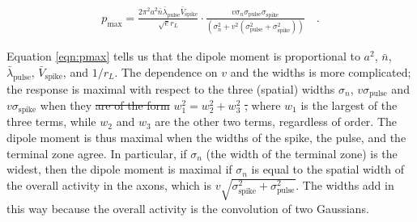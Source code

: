 \documentclass[]{article}
\providecommand{\DIFaddtex}[1]{{\protect\color{blue}\uwave{#1}}} %
\providecommand{\DIFdeltex}[1]{{\protect\color{red}\sout{#1}}}                      %
\providecommand{\DIFaddbegin}{} %
\providecommand{\DIFaddend}{} %
\providecommand{\DIFdelbegin}{} %
\providecommand{\DIFdelend}{} %
\providecommand{\DIFadd}[1]{\texorpdfstring{\DIFaddtex{#1}}{#1}} %
\providecommand{\DIFdel}[1]{\texorpdfstring{\DIFdeltex{#1}}{}} %
\begin{document}
\begin{align}
p_\text{max} = \frac{2  \pi^2  a^2 \bar{n} \bar{\lambda}_{\text{pulse}} \bar{V}_{\text{spike}}}{\sqrt{e} r_L } \cdot
\frac{v \sigma_n \sigma_{\text{pulse}} \sigma_{\text{spike}}}
{\left(\sigma_n^2+v^2 \left(\sigma_{\text{pulse}}^2+\sigma_{\text{spike}}^2\right)\right)} \label{eqn:pmax}
\quad .
\end{align}

Equation \ref{eqn:pmax} tells us that the dipole moment is proportional
to \(a^2\), \(\bar{n}\), \(\bar{\lambda}_{\text{pulse}}\),
\(\bar{V}_{\text{spike}}\), and \(1/r_L\). The dependence on \(v\) and
the widths is more complicated; the response is maximal with respect to
the three (spatial) widths \(\sigma_n\), \(v\sigma_{\text{pulse}}\) and
\(v\sigma_{\text{spike}}\) when they \DIFdelbegin \DIFdel{are of the form
}\DIFdelend \DIFaddbegin \DIFadd{satisfy the condition
}\DIFaddend \(w_1^2=w_2^2+w_3^2\) \DIFdelbegin \DIFdel{, }\DIFdelend where \(w_1\) is the largest of the three terms,
while \(w_2\) and \(w_3\) are the other two terms, regardless of order.
The dipole moment is thus maximal when the widths of the spike, the
pulse, and the terminal zone agree. In particular, if \(\sigma_n\) (the
width of the terminal zone) is the widest, then the dipole moment is
maximal if \(\sigma_n\) is equal to the spatial width of the overall
activity in the axons, which is
\(v\sqrt{\sigma_{\text{spike}}^2+\sigma_{\text{pulse}}^2}\). The widths
add in this way because the overall activity is the convolution of two
Gaussians.
\end{document}
